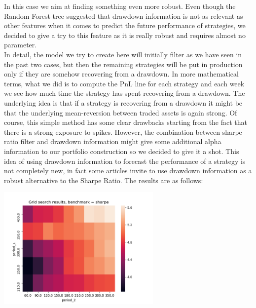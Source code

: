 In this case we aim at finding something even more robust. Even though the Random Forest tree suggested that drawdown information is not as relevant as other features when it comes to predict the future performance of strategies, we decided to give a try to this feature as it is really robust and requires almost no parameter.\\
In detail, the model we try to create here will initially filter as we have seen in the past two cases, but then the remaining strategies will be put in production only if they are somehow recovering from a drawdown. In more mathematical terms, what we did is to compute the PnL line for each strategy and each week we see how much time the strategy has spent recovering from a drawdown. The underlying idea is that if a strategy is recovering from a drawdown it might be that the underlying mean-reversion between traded assets is again strong. Of course, this simple method has some clear drawbacks starting from the fact that there is a strong exposure to spikes. However, the combination between sharpe ratio filter and drawdown information might give some additional alpha information to our portfolio construction so we decided to give it a shot. This idea of using drawdown information to forecast the performance of a strategy is not completely new, in fact some articles \cite{challet} invite to use drawdown information as a robust alternative to the Sharpe Ratio. The results are as follows: 

\begin{center}
	\centering
	\includegraphics[width=0.6\textwidth]{GridSearches/Average_Drawdown/Figure_1.png}
	\label{Average_Drawdown_1}
\end{center}


